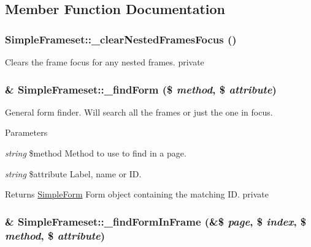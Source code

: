 \subsection{Member Function Documentation}
\hypertarget{class_simple_frameset_a2556cd2c75a765da12e5cd1581f7fc08}{
\subsubsection[{\_\-clearNestedFramesFocus}]{\setlength{\rightskip}{0pt plus 5cm}SimpleFrameset::\_\-clearNestedFramesFocus ()}}
\label{class_simple_frameset_a2556cd2c75a765da12e5cd1581f7fc08}
Clears the frame focus for any nested frames.  private \hypertarget{class_simple_frameset_a4f8df47f61b47c7b6ff806b558d8fa8a}{
\subsubsection[{\_\-findForm}]{\setlength{\rightskip}{0pt plus 5cm}\& SimpleFrameset::\_\-findForm (\$ {\em method}, \/  \$ {\em attribute})}}
\label{class_simple_frameset_a4f8df47f61b47c7b6ff806b558d8fa8a}
General form finder. Will search all the frames or just the one in focus. 
\begin{DoxyParams}{Parameters}
\item[{\em string}]\$method Method to use to find in a page. \item[{\em string}]\$attribute Label, name or ID. \end{DoxyParams}
\begin{DoxyReturn}{Returns}
\hyperlink{class_simple_form}{SimpleForm} Form object containing the matching ID.  private 
\end{DoxyReturn}
\hypertarget{class_simple_frameset_a83c33da7a10c95c885d6ed02ccd249ac}{
\subsubsection[{\_\-findFormInFrame}]{\setlength{\rightskip}{0pt plus 5cm}\& SimpleFrameset::\_\-findFormInFrame (\&\$ {\em page}, \/  \$ {\em index}, \/  \$ {\em method}, \/  \$ {\em attribute})}}
